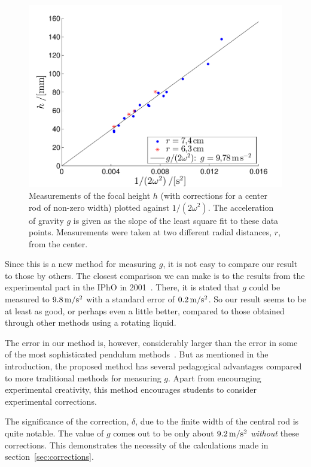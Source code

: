 \documentclass[12pt, a4paper, twocolumn]{article}
\begin{document}
\begin{figure}\centering 
\includegraphics[width=.8\linewidth]{g_minsta_kvadrat.pdf}
\caption{
Measurements of the focal height $h$ (with corrections for a center rod of non-zero width) plotted against $1/(2\omega^2)$. The acceleration of gravity $g$ is given as the slope of the least square fit to these data points. Measurements were taken at two different radial distances, $r$, from the center.}
\label{fig:data} 
\end{figure}

Since this is a new method for measuring $g$, it is not easy to compare our result to those by others. The closest comparison we can make is to the results from the experimental part in the IPhO in 2001~\cite{IPhO2001}. There, it is stated that $g$ could be measured to $\unit[9.8]{m/s^2}$ with a standard error of $\unit[0.2]{m/s^2}$. So our result seems to be at least as good, or perhaps even a little better, compared to those obtained through other methods using a rotating liquid. 

The error in our method is, however, considerably larger than the error in some of the most sophisticated pendulum methods~\cite{Candela2001}. But as mentioned in the introduction, the proposed method has several pedagogical advantages compared to more traditional methods for measuring $g$. Apart from encouraging experimental creativity, this method encourages students to consider experimental corrections. 

The significance of the correction, $\delta$, due to the finite width of the central rod is quite notable. The value of $g$ comes out to be only about $\unit[9.2]{m/s^2}$ \emph{without} these corrections. This demonstrates the necessity of the calculations made in section~\ref{sec:corrections}. 
\end{document}
